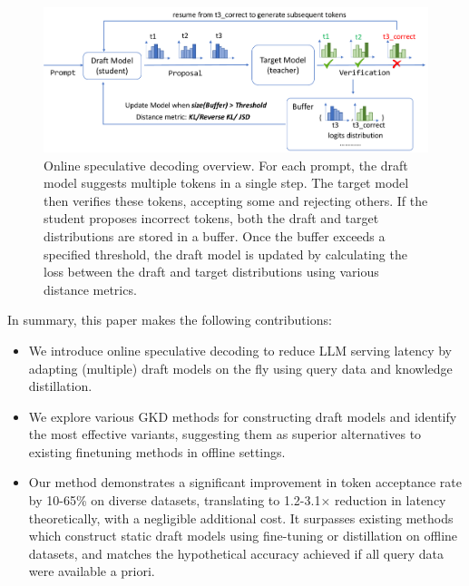 \begin{figure}[h]       
    \centering
    \label{fig:arch}
    \includegraphics[width=0.8\linewidth]{figures/arch.pdf}
    \caption{Online speculative decoding overview. For each prompt, the draft model suggests multiple tokens in a single step. The target model then verifies these tokens, accepting some and rejecting others. If the student proposes incorrect tokens, both the draft and target distributions are stored in a buffer. Once the buffer exceeds a specified threshold, the draft model is updated by calculating the loss between the draft and target distributions using various distance metrics.}
\end{figure}

In summary, this paper makes the following contributions:
\begin{itemize}[leftmargin=*]
    \item We introduce online speculative decoding to reduce LLM serving latency by adapting (multiple) draft models on the fly using query data and knowledge distillation.
    \item We explore various GKD methods for constructing draft models and identify the most effective variants, suggesting them as superior alternatives to existing finetuning methods in offline settings.
    \item Our method demonstrates a significant improvement in token acceptance rate by 10-65\% on diverse datasets, translating to 1.2-3.1$\times$ reduction in latency theoretically, with a negligible additional cost. It surpasses existing methods which construct static draft models using fine-tuning or distillation on offline datasets, and matches the hypothetical accuracy achieved if all query data were available a priori.
\end{itemize}






